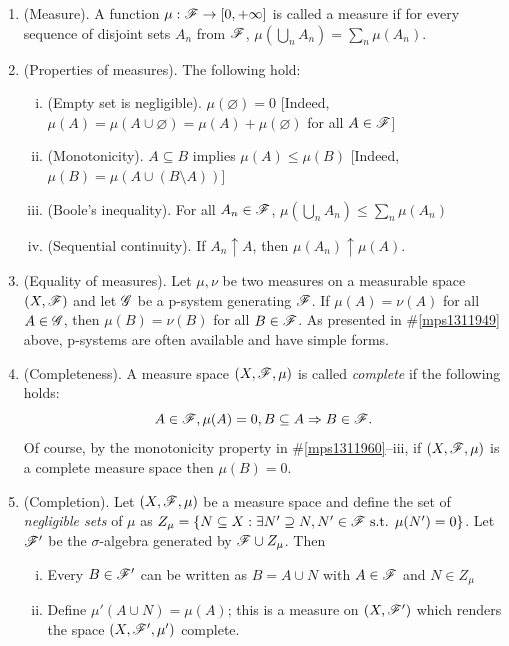 \documentclass[a4paper,10pt]{article}
\begin{document}
\begin{enumerate}
 \item (Measure). A function $\mu: \mathscr{F}\to [0,+\infty]$ is called a measure if 
       for every sequence of disjoint sets $A_n$ from $\mathscr{F}$, $\mu(\bigcup_n A_n)= \sum_n \mu(A_n)$.

 \item \label{mps1311960}
      (Properties of measures). The following hold:
      \begin{enumerate}[i.]
       \item (Empty set is negligible). $\mu(\varnothing)=0$ [Indeed, $\mu(A) = \mu(A\cup \varnothing) = \mu(A) + \mu(\varnothing)$ for all $A\in\mathscr{F}$]
       \item (Monotonicity). $A\subseteq B$ implies $\mu(A) \leq \mu(B)$ [Indeed, $\mu(B) = \mu(A\cup (B\setminus A))$]
       \item (Boole's inequality). For all $A_n\in\mathscr{F}$, $\mu(\bigcup_n A_n) \leq \sum_n \mu(A_n)$
       \item (Sequential continuity). If $A_n\uparrow A$, then $\mu(A_n)\uparrow \mu(A)$.
      \end{enumerate}

 \item (Equality of measures). Let $\mu,\nu$ be two measures on a measurable space $(X,\mathscr{F})$ and let $\mathscr{G}$ 
       be a p-system generating $\mathscr{F}$. If $\mu(A) = \nu(A)$ for all $A\in \mathscr{G}$, then $\mu(B) = \nu(B)$
       for all $B\in\mathscr{F}$. As presented in \#\ref{mps1311949} above, p-systems are often available and 
       have simple forms.
      
 \item (Completeness). A measure space $(X,\mathscr{F},\mu)$ is called \textit{complete} if the following holds:
	\[
	    A \in \mathscr{F}, \mu(A)=0, B\subseteq A \Rightarrow B \in \mathscr{F}.
	\]
       Of course, by the monotonicity property in \#\ref{mps1311960}--iii, if $(X,\mathscr{F},\mu)$ is a complete 
       measure space then $\mu(B) = 0$.
       
 \item (Completion). Let $(X,\mathscr{F},\mu)$ be a measure space and define the set of \textit{negligible sets} of $\mu$ as 
       $Z_\mu = \{N \subseteq X: \exists N'\supseteq N, N'\in\mathscr{F} \text{ s.t. } \mu(N')=0\}$.
       Let $\mathscr{F}'$ be the $\sigma$-algebra generated by $\mathscr{F}\cup Z_\mu$. Then
       \begin{enumerate}[i.]
        \item Every $B\in\mathscr{F}'$ can be written as $B=A\cup N$ with $A\in\mathscr{F}$ and $N\in Z_\mu$
        \item Define $\mu'(A\cup N) = \mu(A)$; this is a measure on $(X,\mathscr{F}')$ which renders 
              the space $(X,\mathscr{F}',\mu')$ complete. 
       \end{enumerate}
 

\end{enumerate}
\end{document}

